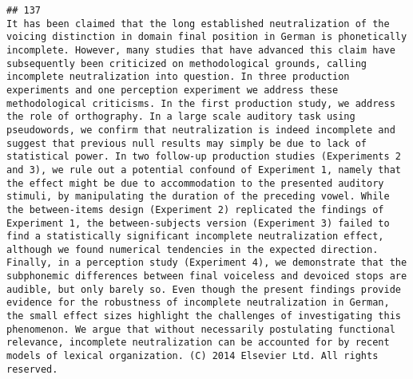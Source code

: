 \documentclass[
  english,
  man]{apa6}
\begin{document}
\begin{verbatim}
## 137                                                                                                                                                                                                                                                                                                                                                                                                                                                                                                                                                                                                                                                                                                                                                                                                                                        It has been claimed that the long established neutralization of the voicing distinction in domain final position in German is phonetically incomplete. However, many studies that have advanced this claim have subsequently been criticized on methodological grounds, calling incomplete neutralization into question. In three production experiments and one perception experiment we address these methodological criticisms. In the first production study, we address the role of orthography. In a large scale auditory task using pseudowords, we confirm that neutralization is indeed incomplete and suggest that previous null results may simply be due to lack of statistical power. In two follow-up production studies (Experiments 2 and 3), we rule out a potential confound of Experiment 1, namely that the effect might be due to accommodation to the presented auditory stimuli, by manipulating the duration of the preceding vowel. While the between-items design (Experiment 2) replicated the findings of Experiment 1, the between-subjects version (Experiment 3) failed to find a statistically significant incomplete neutralization effect, although we found numerical tendencies in the expected direction. Finally, in a perception study (Experiment 4), we demonstrate that the subphonemic differences between final voiceless and devoiced stops are audible, but only barely so. Even though the present findings provide evidence for the robustness of incomplete neutralization in German, the small effect sizes highlight the challenges of investigating this phenomenon. We argue that without necessarily postulating functional relevance, incomplete neutralization can be accounted for by recent models of lexical organization. (C) 2014 Elsevier Ltd. All rights reserved.

\end{verbatim}
\end{document}
